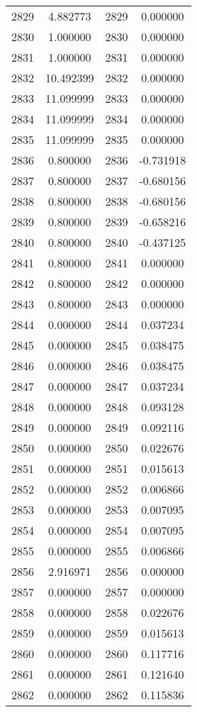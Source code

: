 \documentclass[12pt]{article}
\begin{document}
\begin{longtable}{@{}cccc@{}}
2829 & 4.882773 & 2829 & 0.000000 \\
2830 & 1.000000 & 2830 & 0.000000 \\
2831 & 1.000000 & 2831 & 0.000000 \\
2832 & 10.492399 & 2832 & 0.000000 \\
2833 & 11.099999 & 2833 & 0.000000 \\
2834 & 11.099999 & 2834 & 0.000000 \\
2835 & 11.099999 & 2835 & 0.000000 \\
2836 & 0.800000 & 2836 & -0.731918 \\
2837 & 0.800000 & 2837 & -0.680156 \\
2838 & 0.800000 & 2838 & -0.680156 \\
2839 & 0.800000 & 2839 & -0.658216 \\
2840 & 0.800000 & 2840 & -0.437125 \\
2841 & 0.800000 & 2841 & 0.000000 \\
2842 & 0.800000 & 2842 & 0.000000 \\
2843 & 0.800000 & 2843 & 0.000000 \\
2844 & 0.000000 & 2844 & 0.037234 \\
2845 & 0.000000 & 2845 & 0.038475 \\
2846 & 0.000000 & 2846 & 0.038475 \\
2847 & 0.000000 & 2847 & 0.037234 \\
2848 & 0.000000 & 2848 & 0.093128 \\
2849 & 0.000000 & 2849 & 0.092116 \\
2850 & 0.000000 & 2850 & 0.022676 \\
2851 & 0.000000 & 2851 & 0.015613 \\
2852 & 0.000000 & 2852 & 0.006866 \\
2853 & 0.000000 & 2853 & 0.007095 \\
2854 & 0.000000 & 2854 & 0.007095 \\
2855 & 0.000000 & 2855 & 0.006866 \\
2856 & 2.916971 & 2856 & 0.000000 \\
2857 & 0.000000 & 2857 & 0.000000 \\
2858 & 0.000000 & 2858 & 0.022676 \\
2859 & 0.000000 & 2859 & 0.015613 \\
2860 & 0.000000 & 2860 & 0.117716 \\
2861 & 0.000000 & 2861 & 0.121640 \\
2862 & 0.000000 & 2862 & 0.115836 \\

\end{longtable}
\end{document}
